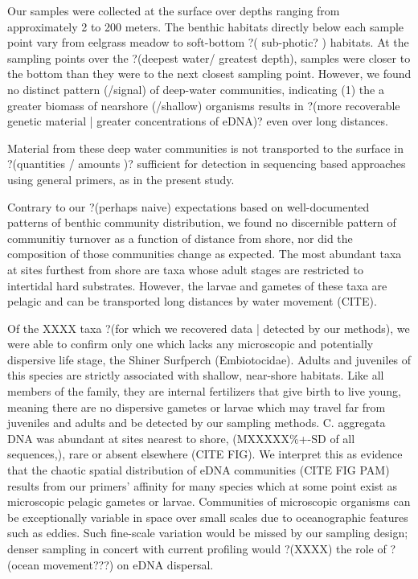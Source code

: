 \documentclass[11pt,letterpaper]{article} %
\begin{document}
Our samples were collected at the surface over depths ranging from approximately 2 to 200 meters.
The benthic habitats directly below each sample point vary from eelgrass meadow to soft-bottom ?( sub-photic? ) habitats.
At the sampling points over the ?(deepest water/ greatest depth), samples were closer to the bottom than they were to the next closest sampling point.
However, we found no distinct pattern (/signal) of deep-water communities, indicating (1) the a greater biomass of nearshore (/shallow) organisms results in ?(more recoverable genetic material | greater concentrations of eDNA)? even over long distances.

{ Material from these deep water communities is not transported to the surface in ?(quantities / amounts )? sufficient for detection in sequencing based approaches using general primers, as in the present study.


Contrary to our ?(perhaps naive) expectations based on well-documented patterns of benthic community distribution, we found no discernible pattern of communitiy turnover as a function of distance from shore, nor did the composition of those communities change as expected.
The most abundant taxa at sites furthest from shore are taxa whose adult stages are restricted to intertidal hard substrates.
However, the larvae and gametes of these taxa are pelagic and can be transported long distances by water movement (CITE).

Of the XXXX taxa ?(for which we recovered data | detected by our methods), we were able to confirm only one which lacks any microscopic and potentially dispersive life stage, the Shiner Surfperch (Embiotocidae).
Adults and juveniles of this species are strictly associated with shallow, near-shore habitats.
Like all members of the family, they are internal fertilizers that give birth to live young, meaning there are no dispersive gametes or larvae which may travel far from juveniles and adults and be detected by our sampling methods.
C. aggregata DNA was abundant at sites nearest to shore, (MXXXXX\%+-SD of all sequences,), rare or absent elsewhere (CITE FIG).
We interpret this as evidence that the chaotic spatial distribution of eDNA communities (CITE FIG PAM) results from our primers' affinity for many species which at some point exist as microscopic pelagic gametes or larvae.
Communities of microscopic organisms can be exceptionally variable in space over small scales due to oceanographic features such as eddies.
Such fine-scale variation would be missed by our sampling design; denser sampling in concert with current profiling would ?(XXXX) the role of ?(ocean movement???) on eDNA dispersal.

}
\end{document}
